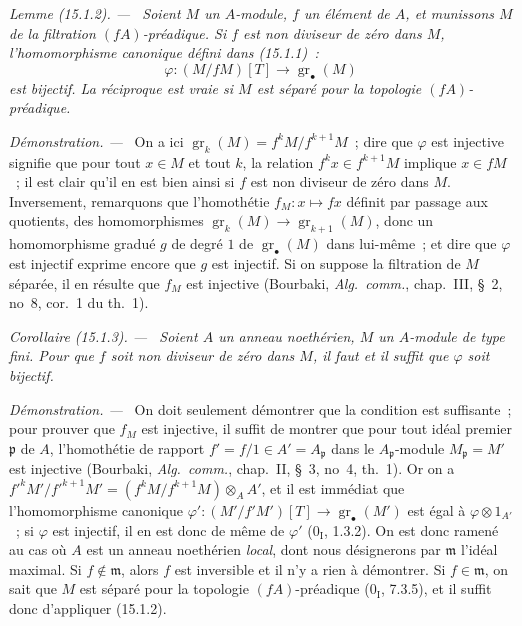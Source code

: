 \documentclass[10pt,oneside]{book}
\makeatletter
\newcommand{\gr}{\operatorname{gr}}
\newcommand{\setmanualcurrentlabel}[1]{\def\@currentlabel{#1}}
\newenvironment{corollary}[1][]{%
  \setmanualcurrentlabel{#1}\par\medskip\noindent\itshape Corollaire (#1). ---\ }{\par}
\newenvironment{lemma}[1][]{%
  \setmanualcurrentlabel{#1}\par\medskip\noindent\itshape Lemme (#1). ---\ }{\par}
\newenvironment{proof}{%
  \par\medskip\noindent\textit{Démonstration. ---\ }}{\par}
\makeatother
\begin{document}
\begin{lemma}[15.1.2]
\label{0.15.1.2-fr}
Soient $M$ un $A$-module, $f$ un élément de $A$, et munissons $M$ de la
filtration $(fA)$-préadique. Si $f$ est non diviseur de zéro dans $M$,
l'homomorphisme canonique défini dans (15.1.1)~:
\[
  \varphi:(M/fM)[T]\longrightarrow\gr_\bullet(M)
  \tag{15.1.2.1}\label{0.15.1.2.1-fr}
\]
est bijectif. La réciproque est vraie si $M$ est séparé pour la topologie
$(fA)$-préadique.
\end{lemma}

\begin{proof}
On a ici $\gr_k(M)=f^kM/f^{k+1}M$~; dire que $\varphi$ est injective signifie
que pour tout $x\in M$ et tout $k$, la relation $f^kx\in f^{k+1}M$ implique
$x\in fM$~; il est clair qu'il en est bien ainsi si $f$ est non diviseur de
zéro dans $M$. Inversement, remarquons que l'homothétie
$f_M:x\mapsto fx$ définit par passage aux quotients, des homomorphismes
$\gr_k(M)\to\gr_{k+1}(M)$, donc un homomorphisme gradué $g$ de degré $1$ de
$\gr_\bullet(M)$ dans lui-même~; et dire que $\varphi$ est injectif exprime
encore que $g$ est injectif. Si on suppose la filtration de $M$ séparée, il en
résulte que $f_M$ est injective (Bourbaki, \emph{Alg.~comm.}, chap.~III,
\S~2, no~8, cor.~1 du th.~1).
\end{proof}

\begin{corollary}[15.1.3]
\label{0.15.1.3-fr}
Soient $A$ un anneau noethérien, $M$ un $A$-module de type fini. Pour que $f$
soit non diviseur de zéro dans $M$, il faut et il suffit que $\varphi$ soit
bijectif.
\end{corollary}

\begin{proof}
On doit seulement démontrer que la condition est suffisante~; pour prouver
que $f_M$ est injective, il suffit de montrer que pour tout idéal premier
$\mathfrak p$ de $A$, l'homothétie de rapport
$f'=f/1\in A'=A_{\mathfrak p}$ dans le $A_{\mathfrak p}$-module
$M_{\mathfrak p}=M'$ est injective (Bourbaki, \emph{Alg.~comm.}, chap.~II,
\S~3, no~4, th.~1). Or on a
$f'^kM'/f'^{k+1}M'=(f^kM/f^{k+1}M)\otimes_A A'$, et il est immédiat que
l'homomorphisme canonique
$\varphi':(M'/f'M')[T]\to\gr_\bullet(M')$ est égal à
$\varphi\otimes 1_{A'}$~; si $\varphi$ est injectif, il en est donc de même de
$\varphi'$ ($0_{\mathrm I}$, 1.3.2). On est donc ramené au cas où $A$ est un
anneau noethérien \emph{local}, dont nous désignerons par $\mathfrak m$
l'idéal maximal. Si $f\notin\mathfrak m$, alors $f$ est inversible et il n'y a
rien à démontrer. Si $f\in\mathfrak m$, on sait que $M$ est séparé pour la
topologie $(fA)$-préadique ($0_{\mathrm I}$, 7.3.5), et il suffit donc
d'appliquer (15.1.2).
\end{proof}
\end{document}
